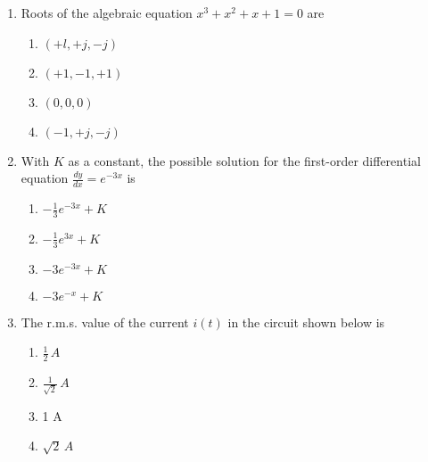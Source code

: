 \documentclass[journal,9pt,onecolumn]{IEEEtran}
\begin{document}
\begin{enumerate}

\item Roots of the algebraic equation $x^3 + x^2 + x + 1 = 0$ are
\begin{multicols}{2}
        \begin{enumerate}
            \item $(+l, +j, -j)$
            \item $(+1, -1, +1)$
            \item $(0, 0, 0)$
            \item $(-1, +j, -j)$
        \end{enumerate}
\end{multicols}
 
\item With $K$ as a constant, the possible solution for the first-order differential equation $\frac{d y}{d x} = e^{-3 x}$ is
\begin{multicols}{2}
    \begin{enumerate}
        \item $-\frac{1}{3} e^{-3 x} + K$
        \item $-\frac{1}{3} e^{3 x} + K$
        \item $-3 e^{-3 x} + K$
        \item $-3 e^{-x} + K$
    \end{enumerate}
\end{multicols}

\item The r.m.s. value of the current $i(t)$ in the circuit shown below is
\begin{center}
    
\end{center}
\begin{multicols}{2}
    \begin{enumerate}
        \item $\frac{1}{2} \, A$
        \item $\frac{1}{\sqrt{2}} \, A$
        \item 1 A
        \item $\sqrt{2} \, A$
    \end{enumerate}
\end{multicols}


\end{enumerate}
\end{document}
